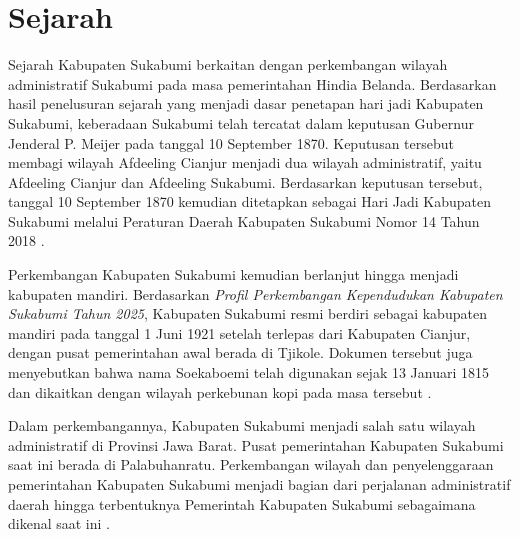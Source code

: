 


\section{Sejarah}

Sejarah Kabupaten Sukabumi berkaitan dengan perkembangan wilayah administratif Sukabumi pada masa pemerintahan Hindia Belanda. Berdasarkan hasil penelusuran sejarah yang menjadi dasar penetapan hari jadi Kabupaten Sukabumi, keberadaan Sukabumi telah tercatat dalam keputusan Gubernur Jenderal P. Meijer pada tanggal 10 September 1870. Keputusan tersebut membagi wilayah Afdeeling Cianjur menjadi dua wilayah administratif, yaitu Afdeeling Cianjur dan Afdeeling Sukabumi. Berdasarkan keputusan tersebut, tanggal 10 September 1870 kemudian ditetapkan sebagai Hari Jadi Kabupaten Sukabumi melalui Peraturan Daerah Kabupaten Sukabumi Nomor 14 Tahun 2018 \parencite{perda14_2018}.

Perkembangan Kabupaten Sukabumi kemudian berlanjut hingga menjadi kabupaten mandiri. Berdasarkan \textit{Profil Perkembangan Kependudukan Kabupaten Sukabumi Tahun 2025}, Kabupaten Sukabumi resmi berdiri sebagai kabupaten mandiri pada tanggal 1 Juni 1921 setelah terlepas dari Kabupaten Cianjur, dengan pusat pemerintahan awal berada di Tjikole. Dokumen tersebut juga menyebutkan bahwa nama Soekaboemi telah digunakan sejak 13 Januari 1815 dan dikaitkan dengan wilayah perkebunan kopi pada masa tersebut \parencite{disdukcapil2026}.

Dalam perkembangannya, Kabupaten Sukabumi menjadi salah satu wilayah administratif di Provinsi Jawa Barat. Pusat pemerintahan Kabupaten Sukabumi saat ini berada di Palabuhanratu. Perkembangan wilayah dan penyelenggaraan pemerintahan Kabupaten Sukabumi menjadi bagian dari perjalanan administratif daerah hingga terbentuknya Pemerintah Kabupaten Sukabumi sebagaimana dikenal saat ini \parencite{disdukcapil2026}.



